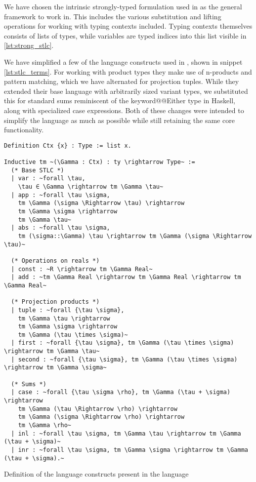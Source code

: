 \documentclass[12pt, final]{article}
\makeatletter
\def\<#1>{\csname keyword@@#1\endcsname}
\makeatother
\begin{document}
We have chosen the intrinsic strongly-typed formulation used in \cite{Benton2011} as the general framework to work in. This includes the various substitution and lifting operations for working with typing contexts included. Typing contexts themselves consists of lists of types, while variables are typed indices into this list visible in \ref{lst:strong_stlc}.

We have simplified a few of the language constructs used in \cite{huot2020correctness}, shown in snippet \ref{lst:stlc_terms}. For working with product types they make use of n-products and pattern matching, which we have alternated for projection tuples. While they extended their base language with arbitrarily sized variant types, we substituted this for standard sums reminiscent of the \<Either> type in Haskell, along with specialized case expressions. Both of these changes were intended to simplify the language as much as possible while still retaining the same core functionality.

\begin{listing}
  \begin{verbatim}
Definition Ctx {x} : Type := list x.

Inductive tm ~(\Gamma : Ctx) : ty \rightarrow Type~ :=
  (* Base STLC *)
  | var : ~forall \tau,
    \tau ∈ \Gamma \rightarrow tm \Gamma \tau~
  | app : ~forall \tau \sigma,
    tm \Gamma (\sigma \Rightarrow \tau) \rightarrow
    tm \Gamma \sigma \rightarrow
    tm \Gamma \tau~
  | abs : ~forall \tau \sigma,
    tm (\sigma::\Gamma) \tau \rightarrow tm \Gamma (\sigma \Rightarrow \tau)~

  (* Operations on reals *)
  | const : ~R \rightarrow tm \Gamma Real~
  | add : ~tm \Gamma Real \rightarrow tm \Gamma Real \rightarrow tm \Gamma Real~

  (* Projection products *)
  | tuple : ~forall {\tau \sigma},
    tm \Gamma \tau \rightarrow
    tm \Gamma \sigma \rightarrow
    tm \Gamma (\tau \times \sigma)~
  | first : ~forall {\tau \sigma}, tm \Gamma (\tau \times \sigma) \rightarrow tm \Gamma \tau~
  | second : ~forall {\tau \sigma}, tm \Gamma (\tau \times \sigma) \rightarrow tm \Gamma \sigma~

  (* Sums *)
  | case : ~forall {\tau \sigma \rho}, tm \Gamma (\tau + \sigma) \rightarrow
    tm \Gamma (\tau \Rightarrow \rho) \rightarrow
    tm \Gamma (\sigma \Rightarrow \rho) \rightarrow
    tm \Gamma \rho~
  | inl : ~forall \tau \sigma, tm \Gamma \tau \rightarrow tm \Gamma (\tau + \sigma)~
  | inr : ~forall \tau \sigma, tm \Gamma \sigma \rightarrow tm \Gamma (\tau + \sigma).~

  \end{verbatim}
  \caption{Definition of the language constructs present in the language}
  \label{lst:stlc_terms}
\end{listing}
\end{document}
